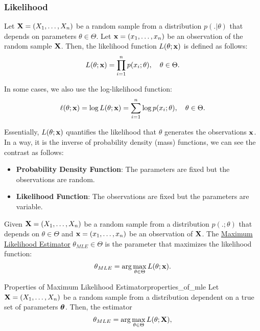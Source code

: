 \begin{proof*}
\subsubsection{Likelihood}
\begin{definition}
    Let ${\bf X}=(X_1, \dots, X_n)$ be a random sample from a distribution $p(.|\theta)$ that depends on parameters $\theta\in\Theta$. Let ${\bf x}=(x_1, \dots, x_n)$ be an observation of the random sample ${\bf X}$. Then, the likelihood function $L(\theta;{\bf x})$ is defined as follows:
    \begin{equation}
        L(\theta;{\bf x}) = \prod_{i=1}^n p(x_i;\theta), \quad \theta\in\Theta.
    \end{equation}

    \noindent In some cases, we also use the log-likelihood function:
    \begin{equation}
        \ell(\theta;{\bf x}) = \log L(\theta;{\bf x}) = \sum_{i=1}^n \log p(x_i;\theta), \quad \theta\in\Theta.
    \end{equation}

    \noindent Essentially, $L(\theta;{\bf x})$ quantifies the likelihood that $\theta$ generates the observations ${\bf x}$. In a way, it is the inverse of probability density (mass) functions, we can see the contrast as follows:
    \begin{itemize}
        \item \textbf{Probability Density Function}: The parameters are fixed but the observations are random.
        \item \textbf{Likelihood Function}: The observations are fixed but the parameters are variable.
    \end{itemize} 
\end{definition}

\begin{definition}
    Given ${\bf X}=(X_1, \dots, X_n)$ be a random sample from a distribution $p(.;\theta)$ that depends on $\theta\in\Theta$ and ${\bf x}=(x_1, \dots, x_n)$ be an observation of ${\bf X}$. The \underline{Maximum Likelihood Estimator} $\theta_{MLE}\in\Theta$ is the parameter that maximizes the likelihood function:
    \begin{equation}
        \theta_{MLE} = \arg\max_{\theta\in\Theta} L(\theta;{\bf x}).
    \end{equation}
\end{definition} 


\begin{proposition}{Properties of Maximum Likelihood Estimator}{properties_of_mle}
    Let ${\bf X}=(X_1, \dots, X_n)$ be a random sample from a distribution dependent on a true set of parameters $\boldsymbol{\theta}$. Then, the estimator
    \begin{equation}
        \theta_{MLE} = \arg\max_{\theta\in\Theta}L(\theta;{\bf X}),
    \end{equation}


\end{proposition}
\end{proof*}
